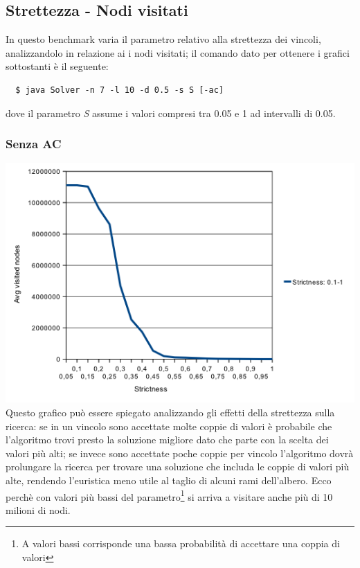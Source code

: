 \documentclass[a4paper,12pt,italian]{article}
\begin{document}
\subsection{Strettezza - Nodi visitati}
In questo benchmark varia il parametro relativo alla strettezza dei vincoli, analizzandolo
in relazione ai i nodi visitati; il comando dato per ottenere i grafici sottostanti
\`e il seguente:
\begin{verbatim}
  $ java Solver -n 7 -l 10 -d 0.5 -s S [-ac]
\end{verbatim}
dove il parametro \textit{S} assume i valori compresi tra 0.05 e 1 ad intervalli di 0.05.

\subsubsection{Senza AC}
\includegraphics[scale=0.8]{strict.png}
\\
Questo grafico pu\`o essere spiegato analizzando gli effetti della strettezza sulla ricerca:
se in un vincolo sono accettate molte coppie di valori \`e probabile che l'algoritmo trovi
presto la soluzione migliore dato che parte con la scelta dei valori pi\`u alti; se invece sono accettate
poche coppie per vincolo l'algoritmo dovr\`a prolungare la ricerca per trovare una soluzione
che includa le coppie di valori pi\`u alte, rendendo l'euristica meno utile al taglio di alcuni rami
dell'albero. Ecco perch\`e con valori pi\`u bassi del
parametro\footnote{A valori bassi corrisponde una bassa probabilit\`a
  di accettare una coppia di valori} si arriva a visitare anche pi\`u di 10 milioni 
di nodi.
\end{document}
